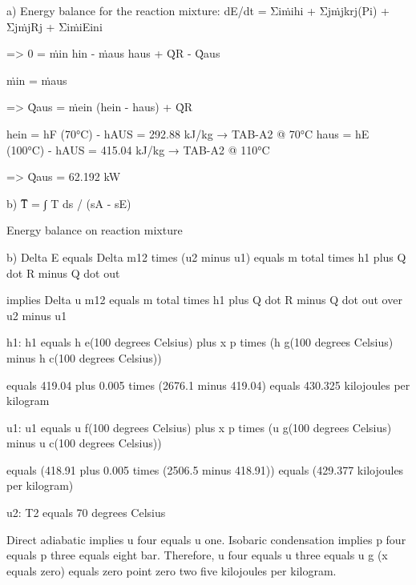 a) Energy balance for the reaction mixture:  
dE/dt = Σiṁihi + Σjṁjkrj(Pi) + ΣjṁjRj + ΣiṁiEini

=> 0 = ṁin hin - ṁaus haus + Q̇R - Q̇aus

ṁin = ṁaus

=> Q̇aus = ṁein (hein - haus) + Q̇R

hein = hF (70°C) - hAUS = 292.88 kJ/kg → TAB-A2 @ 70°C  
haus = hE (100°C) - hAUS = 415.04 kJ/kg → TAB-A2 @ 110°C

=> Q̇aus = 62.192 kW

b) T̅ = ∫ T ds / (sA - sE)

Energy balance on reaction mixture

b) Delta E equals Delta m12 times (u2 minus u1) equals m total times h1 plus Q dot R minus Q dot out

implies Delta u m12 equals m total times h1 plus Q dot R minus Q dot out over u2 minus u1

h1: h1 equals h e(100 degrees Celsius) plus x p times (h g(100 degrees Celsius) minus h c(100 degrees Celsius))

equals 419.04 plus 0.005 times (2676.1 minus 419.04) equals 430.325 kilojoules per kilogram

u1: u1 equals u f(100 degrees Celsius) plus x p times (u g(100 degrees Celsius) minus u c(100 degrees Celsius))

equals (418.91 plus 0.005 times (2506.5 minus 418.91)) equals (429.377 kilojoules per kilogram)

u2: T2 equals 70 degrees Celsius

Direct adiabatic implies u four equals u one. Isobaric condensation implies p four equals p three equals eight bar. Therefore, u four equals u three equals u g (x equals zero) equals zero point zero two five kilojoules per kilogram.